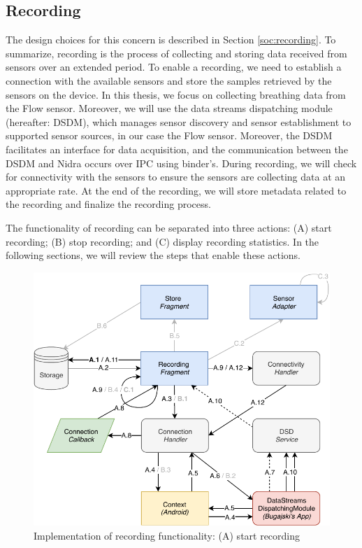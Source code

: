 \subsection{Recording}
The design choices for this concern is described in Section \ref{soc:recording}. To summarize, recording is the process of collecting and storing data received from sensors over an extended period. To enable a recording, we need to establish a connection with the available sensors and store the samples retrieved by the sensors on the device. In this thesis, we focus on collecting breathing data from the Flow sensor. Moreover, we will use the data streams dispatching module (hereafter: DSDM), which manages sensor discovery and sensor establishment to supported sensor sources, in our case the Flow sensor.  Moreover, the DSDM facilitates an interface for data acquisition, and the communication between the DSDM and Nidra occurs over IPC using binder's. During recording, we will check for connectivity with the sensors to ensure the sensors are collecting data at an appropriate rate. At the end of the recording, we will store metadata related to the recording and finalize the recording process. 

The functionality of recording can be separated into three actions: (A) start recording; (B) stop recording; and (C) display recording statistics. In the following sections, we will review the steps that enable these actions. 

\begin{figure}[!h]
    \centering
    \includegraphics[scale=0.7]{images/Recording_ImpA.pdf}
    \caption{Implementation of recording functionality: (A) start recording}
    \label{fig:impl_recordingA}
\end{figure}

